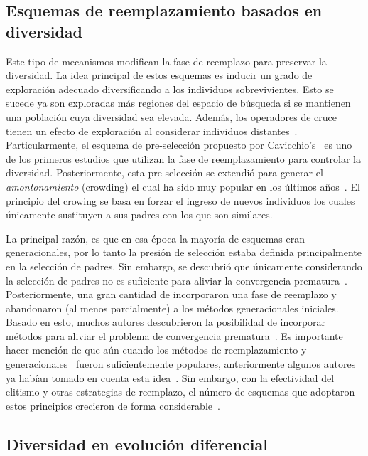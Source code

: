 \subsection{Esquemas de reemplazamiento basados en diversidad}

Este tipo de mecanismos modifican la fase de reemplazo para preservar la diversidad.
%
La idea principal de estos esquemas es inducir un grado de exploración adecuado diversificando a los individuos sobrevivientes.
%
Esto se sucede ya son exploradas más regiones del espacio de búsqueda si se mantienen una población cuya diversidad sea elevada.
%
Además, los operadores de cruce tienen un efecto de exploración al considerar individuos distantes~\cite{eiben1998evolutionary}.
%
Particularmente, el esquema de pre-selección propuesto por Cavicchio's~\cite{grefenstette1986optimization} es uno de los primeros estudios que utilizan la fase de reemplazamiento para controlar la diversidad.
%
Posteriormente, esta pre-selección se extendió para generar el \textit{amontonamiento} (crowding) \cite{de1975analysis} el cual ha sido muy popular en los últimos años~\cite{mahfoud1992crowding, mengshoel2014adaptive}.
%
El principio del crowing se basa en forzar el ingreso de nuevos individuos los cuales únicamente sustituyen a sus padres con los que son similares.

La principal razón, es que en esa época la mayoría de esquemas eran generacionales, por lo tanto la presión de selección estaba definida principalmente en la selección de padres.
%
Sin embargo, se descubrió que únicamente considerando la selección de padres no es suficiente para aliviar la convergencia prematura~\cite{blickle1996comparison}.
%
Posteriormente, una gran cantidad de \EAS{} incorporaron una fase de reemplazo y abandonaron (al menos parcialmente) a los métodos generacionales iniciales.
%
Basado en esto, muchos autores descubrieron la posibilidad de incorporar métodos para aliviar el problema de convergencia prematura~\cite{Crepinsek:13}.
%
Es importante hacer mención de que aún cuando los métodos de reemplazamiento y generacionales~\cite{de2006evolutionary} fueron suficientemente populares, anteriormente algunos autores ya habían tomado en cuenta esta idea~\cite{mahfoud1992crowding}.
%
Sin embargo, con la efectividad del elitismo y otras estrategias de reemplazo, el número de esquemas que adoptaron estos principios crecieron de forma considerable~\cite{lozano2008replacement}.
%
\subsection{Diversidad en evolución diferencial}

